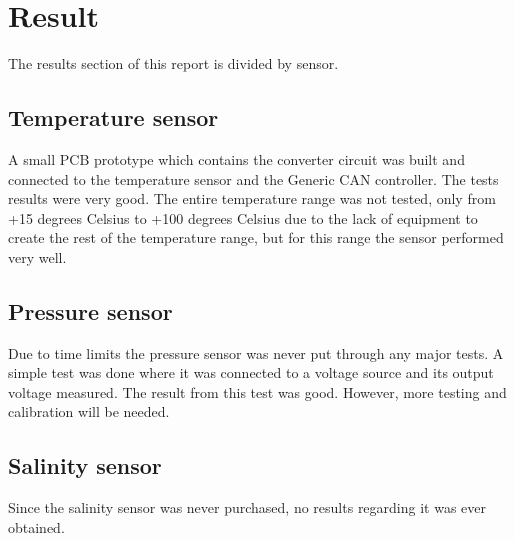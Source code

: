 
\section{Result}\label{sec:result}
The results section of this report is divided by sensor.

\subsection{Temperature sensor}
A small PCB prototype which contains the converter circuit was built and connected to the temperature sensor and the Generic CAN controller. The tests results were very good. The entire temperature range was not tested, only from +15 degrees Celsius to +100 degrees Celsius due to the lack of equipment to create the rest of the temperature range, but for this range the sensor performed very well. 

\subsection{Pressure sensor}
Due to time limits the pressure sensor was never put through any major tests. A simple test was done where it was connected to a voltage source and its output voltage measured. The result from this test was good. However, more testing and calibration will be needed.

\subsection{Salinity sensor}
Since the salinity sensor was never purchased, no results regarding it was ever obtained.

